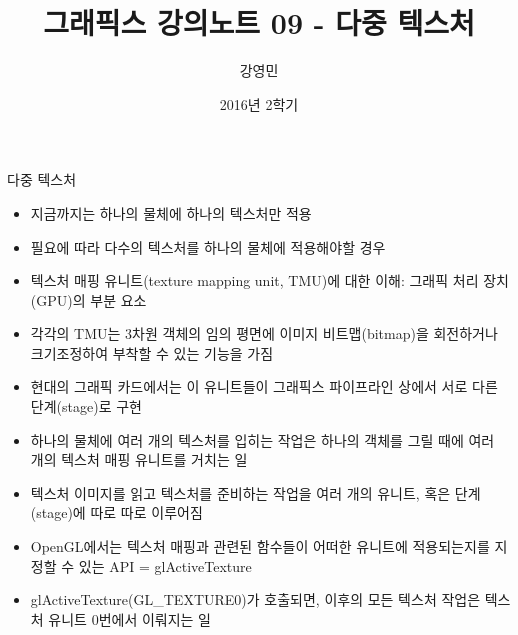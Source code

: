 \documentclass{beamer}
\title[3D 그래픽스 프로그래밍]{그래픽스 강의노트 09 - 다중 텍스처}
\author{강영민}
\institute{동명대학교}
\date{2016년 2학기}
\begin{document}
\begin{frame}
  \titlepage
\end{frame}






\begin{frame}[fragile]{다중 텍스처}

\begin{itemize}
\item 지금까지는 하나의 물체에 하나의 텍스처만 적용
\item 필요에 따라 다수의 텍스처를 하나의 물체에 적용해야할 경우
\item 텍스처 매핑 유니트(texture mapping unit, TMU)에 대한 이해: 그래픽 처리 장치(GPU)의 부분 요소
\item 각각의 TMU는 3차원 객체의 임의 평면에 이미지 비트맵(bitmap)을 회전하거나 크기조정하여 부착할 수 있는 기능을 가짐
\item 현대의 그래픽 카드에서는 이 유니트들이 그래픽스 파이프라인 상에서 서로 다른 단계(stage)로 구현
\item 하나의 물체에 여러 개의 텍스처를 입히는 작업은 하나의 객체를 그릴 때에 여러 개의 텍스처 매핑 유니트를 거치는 일
\item 텍스처 이미지를 읽고 텍스처를 준비하는 작업을 여러 개의 유니트, 혹은 단계(stage)에 따로 따로 이루어짐
\item OpenGL에서는 텍스처 매핑과 관련된 함수들이 어떠한 유니트에 적용되는지를 지정할 수 있는 API = {\sf glActiveTexture}
\item {\sf glActiveTexture(GL\_TEXTURE0)}가 호출되면, 이후의 모든 텍스처 작업은 텍스처 유니트 0번에서 이뤄지는 일
\end{itemize}


\end{frame}
\end{document}
